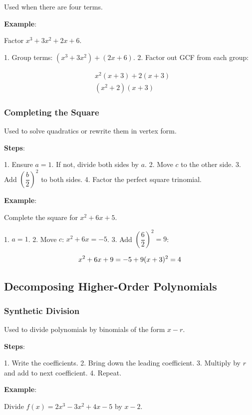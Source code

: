 \documentclass{article}
\begin{document}
\begin{multicols}{2}
Used when there are four terms.

\textbf{Example}:

Factor \( x^3 + 3x^2 + 2x + 6 \).

1. Group terms: \( (x^3 + 3x^2) + (2x + 6) \).
2. Factor out GCF from each group:

\[
\begin{aligned}
& x^2(x + 3) + 2(x + 3) \\
& (x^2 + 2)(x + 3)
\end{aligned}
\]

\subsubsection*{Completing the Square}

Used to solve quadratics or rewrite them in vertex form.

\textbf{Steps}:

1. Ensure \( a = 1 \). If not, divide both sides by \( a \).
2. Move \( c \) to the other side.
3. Add \( \left( \dfrac{b}{2} \right)^2 \) to both sides.
4. Factor the perfect square trinomial.

\textbf{Example}:

Complete the square for \( x^2 + 6x + 5 \).

1. \( a = 1 \).
2. Move \( c \): \( x^2 + 6x = -5 \).
3. Add \( \left( \dfrac{6}{2} \right)^2 = 9 \):

\[
x^2 + 6x + 9 = -5 + 9 \\
(x + 3)^2 = 4
\]

\columnbreak

\subsection*{Decomposing Higher-Order Polynomials}

\subsubsection*{Synthetic Division}

Used to divide polynomials by binomials of the form \( x - r \).

\textbf{Steps}:

1. Write the coefficients.
2. Bring down the leading coefficient.
3. Multiply by \( r \) and add to next coefficient.
4. Repeat.

\textbf{Example}:

Divide \( f(x) = 2x^3 - 3x^2 + 4x - 5 \) by \( x - 2 \).


\end{multicols}
\end{document}
